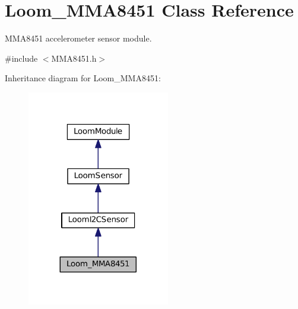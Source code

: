 \hypertarget{class_loom___m_m_a8451}{}\section{Loom\+\_\+\+M\+M\+A8451 Class Reference}
\label{class_loom___m_m_a8451}


M\+M\+A8451 accelerometer sensor module.  




{\ttfamily \#include $<$M\+M\+A8451.\+h$>$}



Inheritance diagram for Loom\+\_\+\+M\+M\+A8451\+:\nopagebreak
\begin{figure}[H]
\begin{center}
\leavevmode
\includegraphics[width=176pt]{class_loom___m_m_a8451__inherit__graph}
\end{center}
\end{figure}
